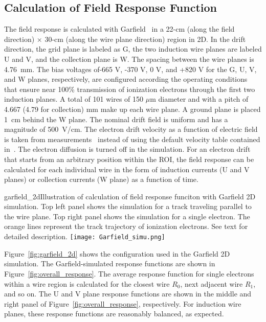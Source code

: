 \subsection{Calculation of Field Response Function}
\label{sec:decon-frf-calc}

The field response is calculated with Garfield~\cite{garfield} in a 22-cm (along the 
field direction) $\times$ 30-cm (along the wire plane direction) region in 2D.  
In the drift direction, the grid plane is labeled as G, the two induction %
wire planes are labeled U and V, and the collection plane is W.  The spacing between the wire 
planes is 4.76~mm. The bias voltages of-665 V, -370 V, 0 V, and +820 V for the G, U, V, and 
W planes, respectively, are configured according the operating conditions that ensure near 100\%
transmission of ionization electrons through the first two induction planes.  
A total of 101 wires of 150 $\mu$m diameter and with a pitch of 4.667 (4.79 for collection) mm make up
 each wire plane. 
    A ground plane is placed 1~cm behind the W plane.  The nominal drift
    field is uniform and has a magnitude of 500~V/cm. The electron drift velocity as a function of
    electric field is taken from measurements~\cite{Li:2015rqa,lar_property}
    instead of using the default velocity table contained in~\cite{garfield}. %
    The electron diffusion is turned off in the simulation. 
    For an 
    electron drift that starts from an arbitrary position within the ROI, the field response can
    be calculated for each individual wire in the form of induction currents 
    (U and V planes) or collection currents (W plane) as a function of time.

\begin{cdrfigure}{garfield_2d}{Illustration of calculation of field response funciton with Garfield 2D simulation.
Top left panel shows the simulation for a track traveling parallel to the wire plane. Top right panel
shows the simulation for a single electron. The orange lines represent the track trajectory of ionization
electrons. See text for detailed description.}
  \texttt{[image: Garfield\_simu.png]}
\end{cdrfigure}
    
    
    Figure~\ref{fig:garfield_2d} shows the configuration used in the Garfield 2D simulation.
The Garfield-simulated response functions are shown in Figure~\ref{fig:overall_response}.
 The average response function for single electrons within a wire region 
is calculated for the closest wire $R_0$, next adjacent wire $R_1$, and so on. The U and 
V plane response functions are shown in the middle and right panel of 
Figure~\ref{fig:overall_response}, respectively.  For induction wire planes, these response 
functions are reasonably balanced, as expected.




